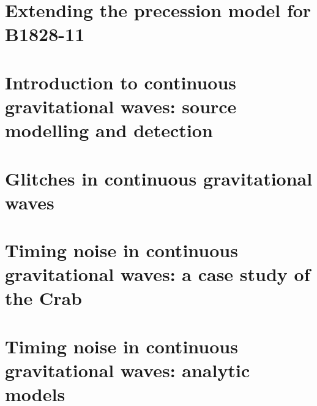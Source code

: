\documentclass[twoside]{thesis}
\begin{document}
\chapter{Extending the precession model for B1828-11}
\label{sec: extending precession models}

\chapter{Introduction to continuous gravitational waves: source modelling and detection}
\label{sec: intro to cgw}


\chapter{Glitches in continuous gravitational waves}
\label{sec: glitches in cgw}

\chapter{Timing noise in continuous gravitational waves: a case study of the Crab}
\label{sec: timing noise in cgw}


\chapter{Timing noise in continuous gravitational waves: analytic models}
\label{sec: timing in cgw analytic}





\end{document}
